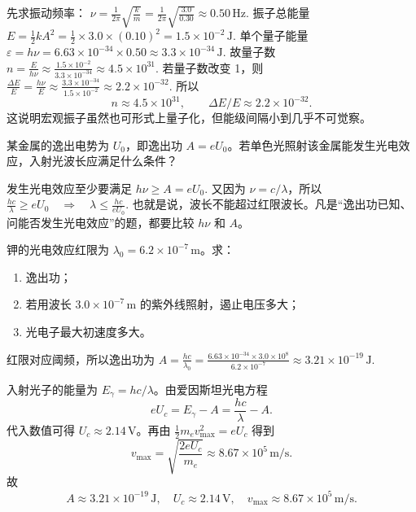 \documentclass[lang=cn,11pt]{elegantbook}
\begin{document}
\begin{solution}
先求振动频率：
 \(\nu=\frac{1}{2\pi}\sqrt{\frac{k}{m}} =\frac{1}{2\pi}\sqrt{\frac{3.0}{0.30}} \approx 0.50\,\mathrm{Hz}.\) 
振子总能量
 \(E=\frac12 kA^2 =\frac12\times 3.0\times (0.10)^2 =1.5\times 10^{-2}\,\mathrm{J}.\) 
单个量子能量
 \(\varepsilon=h\nu =6.63\times 10^{-34}\times 0.50 \approx 3.3\times 10^{-34}\,\mathrm{J}.\) 
故量子数
 \(n=\frac{E}{h\nu} \approx \frac{1.5\times 10^{-2}}{3.3\times 10^{-34}} \approx 4.5\times 10^{31}.\) 
若量子数改变 1，则
 \(\frac{\Delta E}{E}=\frac{h\nu}{E} \approx \frac{3.3\times 10^{-34}}{1.5\times 10^{-2}} \approx 2.2\times 10^{-32}.\) 
所以
\[
\boxed{n\approx 4.5\times 10^{31},\qquad \Delta E/E\approx 2.2\times 10^{-32}.}
\]
这说明宏观振子虽然也可形式上量子化，但能级间隔小到几乎不可觉察。
\end{solution}

\begin{exercise}[发生光电效应时波长必须满足什么条件]
某金属的逸出电势为 \(U_0\)，即逸出功 \(A=eU_0\)。若单色光照射该金属能发生光电效应，入射光波长应满足什么条件？
\end{exercise}

\begin{solution}
发生光电效应至少要满足
 \(h\nu\ge A=eU_0.\) 
又因为 \(\nu=c/\lambda\)，所以
 \(\frac{hc}{\lambda}\ge eU_0 \quad\Longrightarrow\quad \boxed{\lambda\le \frac{hc}{eU_0}.}\) 
也就是说，波长不能超过红限波长。凡是“逸出功已知、问能否发生光电效应”的题，都要比较 \(h\nu\) 和 \(A\)。
\end{solution}

\begin{exercise}
钾的光电效应红限为 \(\lambda_0=6.2\times 10^{-7}\,\mathrm{m}\)。求：
\begin{enumerate}
 \item 逸出功；
 \item 若用波长 \(3.0\times 10^{-7}\,\mathrm{m}\) 的紫外线照射，遏止电压多大；
 \item 光电子最大初速度多大。
\end{enumerate}
\end{exercise}

\begin{solution}
红限对应阈频，所以逸出功为
 \(A=\frac{hc}{\lambda_0} =\frac{6.63\times 10^{-34}\times 3.0\times 10^8}{6.2\times 10^{-7}} \approx 3.21\times 10^{-19}\,\mathrm{J}.\) 

入射光子的能量为 \(E_\gamma=hc/\lambda\)。由爱因斯坦光电方程
\[
eU_c=E_\gamma-A=\frac{hc}{\lambda}-A.
\]
代入数值可得 \(U_c\approx 2.14\,\mathrm{V}\)。再由 \(\frac12 m_ev_{\max}^2=eU_c\) 得到
\[
v_{\max}=\sqrt{\frac{2eU_c}{m_e}}
\approx 8.67\times 10^5\,\mathrm{m/s}.
\]
故
\[
\boxed{
A\approx 3.21\times 10^{-19}\,\mathrm{J},\quad
U_c\approx 2.14\,\mathrm{V},\quad
v_{\max}\approx 8.67\times 10^5\,\mathrm{m/s}.
}
\]
\end{solution}
\end{document}
